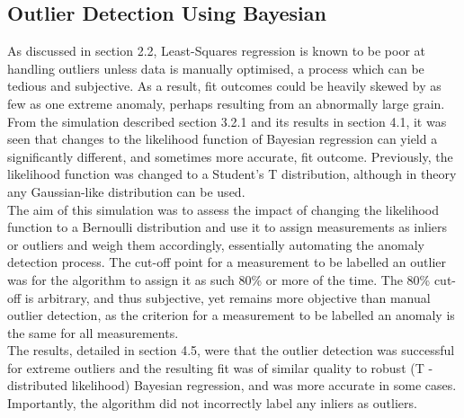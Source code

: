 \subsection{Outlier Detection Using Bayesian}
\label{subsec:subsec01}

As discussed in section 2.2, Least-Squares regression is known to be poor at handling outliers unless data is manually optimised, a process which can be tedious and subjective. As a result, fit outcomes could be heavily skewed by as few as one extreme anomaly, perhaps resulting from an abnormally large grain. From the simulation described section 3.2.1 and its results in section 4.1, it was seen that changes to the likelihood function of Bayesian regression can yield a significantly different, and sometimes more accurate, fit outcome. Previously, the likelihood function was changed to a Student's T distribution, although in theory any Gaussian-like distribution can be used. \\

The aim of this simulation was to assess the impact of changing the likelihood function to a Bernoulli distribution and use it to assign measurements as inliers or outliers and weigh them accordingly, essentially automating the anomaly detection process. The cut-off point for a measurement to be labelled an outlier was for the algorithm to assign it as such 80\% or more of the time. The 80\% cut-off is arbitrary, and thus subjective, yet remains more objective than manual outlier detection, as the criterion for a measurement to be labelled an anomaly is the same for all measurements.\\

The results, detailed in section 4.5, were that the outlier detection was successful for extreme outliers and the resulting fit was of similar quality to robust (T - distributed likelihood) Bayesian regression, and was more accurate in some cases. Importantly, the algorithm did not incorrectly label any inliers as outliers.

